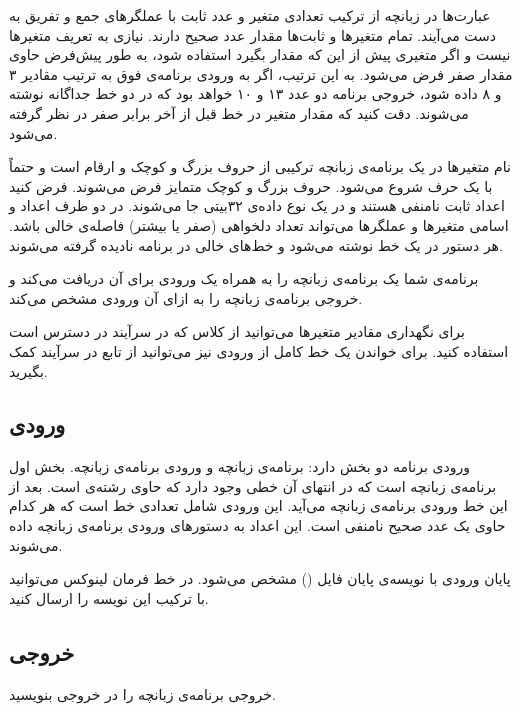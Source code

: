 \documentclass{utsignal}
\begin{document}
    عبارت‌ها در زبانچه از ترکیب تعدادی متغیر و عدد ثابت با عملگرهای جمع و تفریق به دست می‌آیند. تمام متغیرها و ثابت‌ها مقدار عدد صحیح دارند. نیازی به تعریف متغیرها نیست و اگر متغیری پیش از این که مقدار بگیرد استفاده شود، به طور پیش‌فرض حاوی مقدار صفر فرض می‌شود. به این ترتیب، اگر به ورودی برنامه‌ی فوق به ترتیب مقادیر ۳ و ۸ داده شود، خروجی برنامه دو عدد ۱۳ و ۱۰ خواهد بود که در دو خط جداگانه نوشته می‌شوند. دقت کنید که مقدار متغیر  در خط قبل از آخر برابر صفر در نظر گرفته می‌شود.

    نام متغیرها در یک برنامه‌ی زبانچه ترکیبی از حروف بزرگ و کوچک و ارقام است و حتماً با یک حرف شروع می‌شود. حروف بزرگ و کوچک متمایز فرض می‌شوند. فرض کنید اعداد ثابت نامنفی هستند و در یک نوع داده‌ی ۳۲‌بیتی جا می‌شوند. در دو طرف اعداد و اسامی متغیرها و عملگرها می‌تواند تعداد دلخواهی (صفر یا بیشتر) فاصله‌ی خالی باشد. هر دستور در یک خط نوشته می‌شود و خط‌های خالی در برنامه نادیده گرفته می‌شوند.

    برنامه‌ی شما یک برنامه‌ی زبانچه را به همراه یک ورودی برای آن دریافت می‌کند و خروجی برنامه‌ی زبانچه را به ازای آن ورودی مشخص می‌کند.

    برای نگهداری مقادیر متغیرها می‌توانید از کلاس  که در سرآیند  در دسترس است استفاده کنید.
    برای خواندن یک خط کامل از ورودی نیز می‌توانید از تابع  در سرآیند  کمک بگیرید.

    \subsection{ورودی}

    ورودی برنامه دو بخش دارد: برنامه‌ی زبانچه و ورودی برنامه‌ی زبانچه.    
    بخش اول برنامه‌ی زبانچه است که در انتهای آن خطی وجود دارد که حاوی رشته‌ی  است.
    بعد از این خط ورودی برنامه‌ی زبانچه می‌آید. این ورودی شامل تعدادی خط است که هر کدام حاوی یک عدد صحیح نامنفی است. این اعداد به دستورهای ورودی برنامه‌ی زبانچه داده می‌شوند.
    
    پایان ورودی با نویسه‌ی پایان فایل () مشخص می‌شود. در خط فرمان لینوکس می‌توانید با ترکیب  این نویسه را ارسال کنید.

    \subsection{خروجی}
    
    خروجی برنامه‌ی زبانچه را در خروجی بنویسید.
\end{document}
